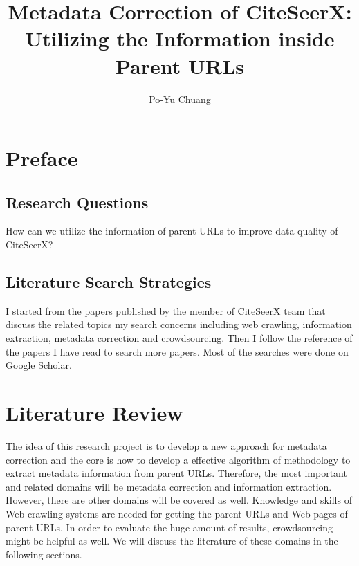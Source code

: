 \documentclass[prodmode]{acmsmall} %
\begin{document}

\title{Metadata Correction of CiteSeerX: Utilizing the Information inside Parent URLs}
\author{
Po-Yu Chuang
}

\maketitle

\section{Preface}

\subsection{Research Questions}

How can we utilize the information of parent URLs to improve data quality of CiteSeerX?

\subsection{Literature Search Strategies}

I started from the papers published by the member of CiteSeerX team that discuss the related topics my search concerns including web crawling, information extraction, metadata correction and crowdsourcing. Then I follow the reference of the papers I have read to search more papers. Most of the searches were done on Google Scholar.

\section{Literature Review}
The idea of this research project is to develop a new approach for metadata correction and the core is how to develop a effective algorithm of methodology to extract metadata information from parent URLs. Therefore, the most important and related domains will be metadata correction and information extraction. However, there are other domains will be covered as well. Knowledge and skills of Web crawling systems are needed for getting the parent URLs and Web pages of parent URLs. In order to evaluate the huge amount of results, crowdsourcing might be helpful as well. We will discuss the literature of these domains in the following sections. 
\end{document}
